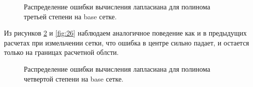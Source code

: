 \begin{figure}[H]
    \centering
    \caption{Распределение ошибки вычисления лапласиана для полинома третьей степени на base сетке.}
    \label{fig:24}
\end{figure}

Из рисунков \ref{fig:25} и \ref{fig:26} наблюдаем аналогичное поведение как и в предыдущих расчетах при измельчении сетки, что ошибка в центре сильно падает, и остается только на границах расчетной облсти.
\begin{figure}[H]
    \centering
    \caption{Распределение ошибки вычисления лапласиана для полинома четвертой степени на base сетке.}
    \label{fig:25}
\end{figure}

